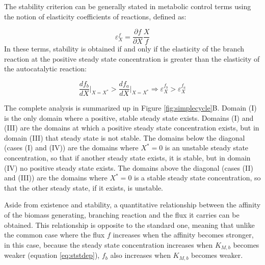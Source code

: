     The stability criterion can be generally stated in metabolic control terms \cite{Fell1997-bp} using the notion of elasticity coefficients of reactions, defined as:

    \begin{equation*}
    \varepsilon^f_X=\frac{\partial f}{\partial X}\frac{X}{f}
    \end{equation*}
    In these terms, stability is obtained if and only if the elasticity of the branch reaction at the positive steady state concentration is greater than the elasticity of the autocatalytic reaction:

    \begin{equation*}
        \frac{df_b}{dX}\Big\vert_{X=X^*}>\frac{df_a}{dX}\Big\vert_{X=X^*} \Rightarrow \varepsilon^{f_b}_X>\varepsilon^{f_a}_X
    \end{equation*}

    The complete analysis is summarized up in Figure \ref{fig:simplecycle}B.
    Domain (I) is the only domain where a positive, stable steady state exists.
    Domains (I) and (III) are the domains at which a positive steady state concentration exists, but in domain (III) that steady state is not stable.
    The domains below the diagonal (cases (I) and (IV)) are the domains where $X^*=0$ is an unstable steady state concentration, so that if another steady state exists, it is stable, but in domain (IV) no positive steady state exists.
    The domains above the diagonal (cases (II) and (III)) are the domains where $X^*=0$ is a stable steady state concentration, so that the other steady state, if it exists, is unstable.

    Aside from existence and stability, a quantitative relationship between the affinity of the biomass generating, branching reaction and the flux it carries can be obtained.
    This relationship is opposite to the standard one, meaning that unlike the common case where the flux $f$ increases when the affinity becomes stronger, in this case, because the steady state concentration increases when $K_{M,b}$ becomes weaker (equation \ref{eq:ststdep}), $f_b$ also increases when $K_{M,b}$ becomes weaker.

